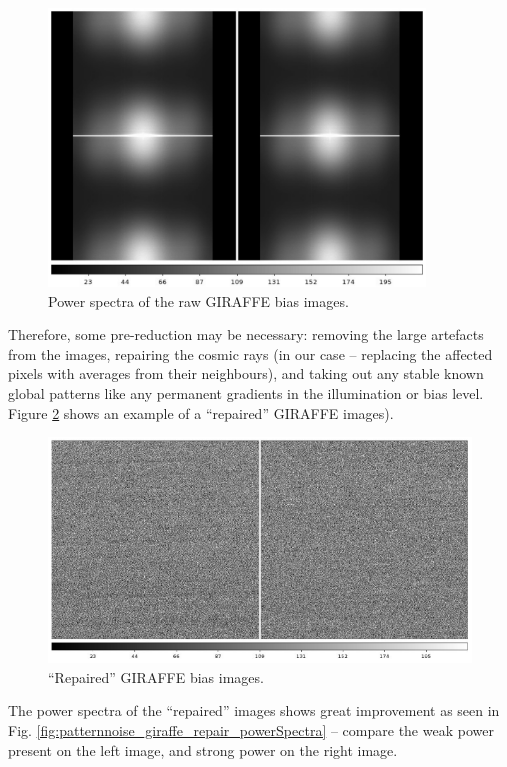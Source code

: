 \begin{figure}[H]
  \centering \subfigure
  \includegraphics[width=10.0cm]{figures/patternnoise_giraffe-image.png} 
  \caption[]{\footnotesize Power spectra of the raw GIRAFFE bias images.}
  \label{fig:patternnoise_giraffe_image}
\end{figure}

Therefore, some pre-reduction may be necessary: removing the large 
artefacts from the images, repairing the cosmic rays (in our case -- 
replacing the affected pixels with averages from their neighbours), 
and taking out any stable known global patterns like any permanent 
gradients in the illumination or bias level. 
Figure \ref{fig:patternnoise_giraffe_repair_bias} shows an example 
of a ``repaired'' GIRAFFE images).

\begin{figure}[H]
  \centering \subfigure
  \includegraphics[width=12.0cm]{figures/patternnoise_giraffe-repair_bias.png} 
  \caption[]{\footnotesize ``Repaired'' GIRAFFE bias images.}
  \label{fig:patternnoise_giraffe_repair_bias}
\end{figure}

The power spectra of the ``repaired'' images shows great improvement 
as seen in Fig. \ref{fig:patternnoise_giraffe_repair_powerSpectra} --
compare the weak power present on the left image, and strong power on 
the right image.

